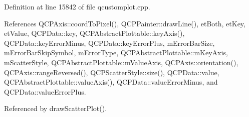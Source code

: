 Definition at line 15842 of file qcustomplot.\+cpp.



References Q\+C\+P\+Axis\+::coord\+To\+Pixel(), Q\+C\+P\+Painter\+::draw\+Line(), et\+Both, et\+Key, et\+Value, Q\+C\+P\+Data\+::key, Q\+C\+P\+Abstract\+Plottable\+::key\+Axis(), Q\+C\+P\+Data\+::key\+Error\+Minus, Q\+C\+P\+Data\+::key\+Error\+Plus, m\+Error\+Bar\+Size, m\+Error\+Bar\+Skip\+Symbol, m\+Error\+Type, Q\+C\+P\+Abstract\+Plottable\+::m\+Key\+Axis, m\+Scatter\+Style, Q\+C\+P\+Abstract\+Plottable\+::m\+Value\+Axis, Q\+C\+P\+Axis\+::orientation(), Q\+C\+P\+Axis\+::range\+Reversed(), Q\+C\+P\+Scatter\+Style\+::size(), Q\+C\+P\+Data\+::value, Q\+C\+P\+Abstract\+Plottable\+::value\+Axis(), Q\+C\+P\+Data\+::value\+Error\+Minus, and Q\+C\+P\+Data\+::value\+Error\+Plus.



Referenced by draw\+Scatter\+Plot().


